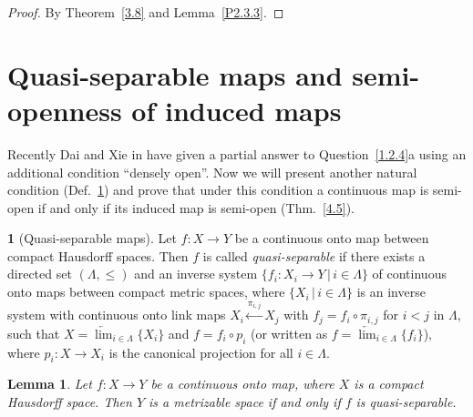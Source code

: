 \documentclass[12pt,final,3p,times]{elsarticle}
\newtheorem{lem}[thm]{Lemma}
\theoremstyle{definition}
\newtheorem{se}[thm]{}
\numberwithin{equation}{section}
\begin{document}
\begin{proof}
By Theorem~\ref{3.8} and Lemma~\ref{P2.3.3}.
\end{proof}

\section{Quasi-separable maps and semi-openness of induced maps}\label{s4}
Recently Dai and Xie in \cite[Thm.~10C]{DX} have given a partial answer to Question~\ref{1.2.4}a using an additional condition ``densely open''. Now we will present another natural condition (Def.~\ref{4.1}) and prove that under this condition a continuous map is semi-open if and only if its induced map is semi-open (Thm.~\ref{4.5}).

\begin{se}[Quasi-separable maps]\label{4.1}
Let $f\colon X\rightarrow Y$ be a continuous onto map between compact Hausdorff spaces. Then $f$ is called \textit{quasi-separable}
    if there exists a directed set $(\Lambda,\le)$ and an inverse system $\{f_i\colon X_i\rightarrow Y\,|\,i\in\Lambda\}$ of continuous onto maps between compact metric spaces,
where $\{X_i\,|\,i\in\Lambda\}$ is an inverse system with continuous onto link maps $X_i\xleftarrow{\pi_{i,j}}X_j$ with $f_j=f_i\circ\pi_{i,j}$ for $i<j$ in $\Lambda$, such that $X=\underleftarrow{\lim}_{i\in\Lambda}\{X_i\}$ and $f=f_i\circ p_i$ (or written as $f=\underleftarrow{\lim}_{i\in\Lambda}\{f_i\}$), where $p_i\colon X\rightarrow X_i$ is the canonical projection for all $i\in\Lambda$. 
\end{se}

\begin{lem}\label{4.2}
Let $f\colon X\rightarrow Y$ be a continuous onto map, where $X$ is a compact Hausdorff space. Then $Y$ is a metrizable space if and only if $f$ is quasi-separable.
\end{lem}
\end{document}
